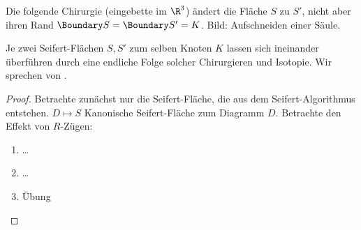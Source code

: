 Die folgende Chirurgie (eingebette im $\R^3$) ändert die Fläche $S$ zu $S'$, nicht aber ihren Rand $\Boundary S = \Boundary S' = K$.
Bild: Aufschneiden einer Säule.

\begin{st}
    Je zwei Seifert-Flächen $S, S'$ zum selben Knoten $K$ lassen sich ineinander überführen durch eine endliche Folge solcher Chirurgieren und Isotopie.
    Wir sprechen von .
    \begin{proof}
        Betrachte zunächst nur die Seifert-Fläche, die aus dem Seifert-Algorithmus entstehen.
        $D \mapsto S$ Kanonische Seifert-Fläche zum Diagramm $D$.
        Betrachte den Effekt von $R$-Zügen:
        \begin{enumerate}[R1]
            \item
                …
            \item
                …
            \item
                Übung
        \end{enumerate}
    \end{proof}
\end{st}





